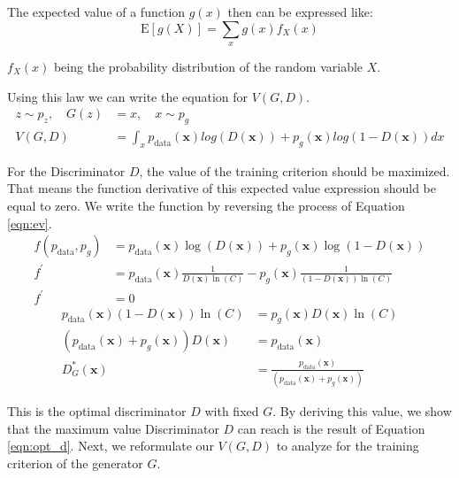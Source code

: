 The expected value of a function $g(x)$ then can be expressed like:
\begin{equation}
    \mathrm{E}[g(X)]=\sum_{x} g(x) f_{X}(x)  
\end{equation}

$f_{X}(x)$ being the probability distribution of the random variable $X$. 

Using this law we can write the equation for $V(G, D)$. 
\begin{align}
    z \sim p_z , \quad G(z) &= x, \quad x \sim p_g\\ 
    V( G, D) &= \int_x p_{\text{data}}(\boldsymbol{x}) log(D(\boldsymbol{x})) + p_g(\boldsymbol{x}) log(1 - D(\boldsymbol{x})) dx
\end{align}

For the Discriminator $D$, the value of the training criterion should be maximized. That means the
function derivative of this expected value expression should be equal to zero. We write the
function by reversing the process of Equation \ref{eqn:ev}.
\begin{align}
    f( p_{\text{data}}, p_g) &= p_{\text{data}}(\boldsymbol{x}) \log(D(\boldsymbol{x})) + p_g(\boldsymbol{x}) \log(1 - D(\boldsymbol{x})) \\[5pt]
    f^{\prime} &= p_{\text{data}}(\boldsymbol{x}) \frac{1}{D(\boldsymbol{x}) \ln(C)} - p_g(\boldsymbol{x}) \frac{1}{(1- D(\boldsymbol{x})) \ln(C)} \\[5pt]
    f^{\prime} &= 0
\end{align}
\begin{align}
    p_{\text{data}}(\boldsymbol{x}) (1- D(\boldsymbol{x})) \ln(C) &= p_g(\boldsymbol{x}) D(\boldsymbol{x}) \ln(C)\\[5pt]
    (p_{\text{data}}(\boldsymbol{x}) +  p_g(\boldsymbol{x})) D(\boldsymbol{x}) &= p_{\text{data}}(\boldsymbol{x})\\[5pt]
    D^{*}_G(\boldsymbol{x}) &= \frac{p_{\text{data}}(\boldsymbol{x})}{(p_{\text{data}}(\boldsymbol{x}) +  p_g(\boldsymbol{x}))}\label{eqn:opt_d}
\end{align}

This is the optimal discriminator $D$ with fixed $G$. By deriving this value, we show that the
maximum value Discriminator $D$ can reach is the result of Equation \ref{eqn:opt_d}. Next, we reformulate our
$V(G, D)$ to analyze for the training criterion of the generator $G$. 

